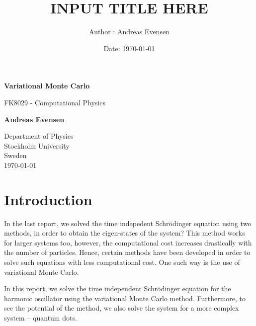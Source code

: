 \documentclass[a4paper]{article}
\title{INPUT TITLE HERE}
\author{Author : Andreas Evensen}
\date{Date: \today}
\newcommand{\newparagraph}{\vspace{.5cm}\noindent}
\begin{document}
\begin{titlepage}
    \begin{center}
        \vspace*{1cm}
        
        \Huge
        \textbf{Variational Monte Carlo}
        
        \vspace{0.5cm}
        \LARGE
        FK8029 - Computational Physics
        
        \vspace{1.5cm}
        
        \textbf{Andreas Evensen}
        
        \vfill
        
        
        \Large
        Department of Physics\\
        Stockholm University\\
        Sweden\\
        \today
    \end{center}
\end{titlepage}


\section{Introduction}
In the last report, we solved the time indepedent Schrödinger equation using two methods, in order to obtain the eigen-states of the system?
This method works for larger systems too, however, the computational cost increases drastically with the number of particles.
Hence, certain methods have been developed in order to solve such equations with less computational cost. One such way is the use of variational Monte Carlo.

\newparagraph
In this report, we solve the time independent Schrödinger equation for the harmonic oscillator using the variational Monte Carlo method.
Furthermore, to see the potential of the method, we also solve the system for a more complex system -- quantum dots.

\tableofcontents

\newpage
\end{document}
